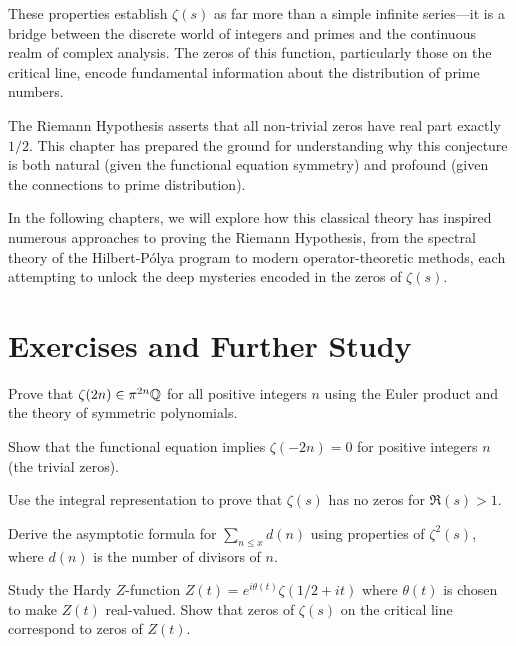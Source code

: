 These properties establish $\zeta(s)$ as far more than a simple infinite series—it is a bridge between the discrete world of integers and primes and the continuous realm of complex analysis. The zeros of this function, particularly those on the critical line, encode fundamental information about the distribution of prime numbers.

\begin{highlight}
The Riemann Hypothesis asserts that all non-trivial zeros have real part exactly $1/2$. This chapter has prepared the ground for understanding why this conjecture is both natural (given the functional equation symmetry) and profound (given the connections to prime distribution).
\end{highlight}

In the following chapters, we will explore how this classical theory has inspired numerous approaches to proving the Riemann Hypothesis, from the spectral theory of the Hilbert-Pólya program to modern operator-theoretic methods, each attempting to unlock the deep mysteries encoded in the zeros of $\zeta(s)$.

\section{Exercises and Further Study}
\label{sec:exercises}

\begin{exercise}
Prove that $\zeta(2n) \in \pi^{2n} \mathbb{Q}$ for all positive integers $n$ using the Euler product and the theory of symmetric polynomials.
\end{exercise}

\begin{exercise}
Show that the functional equation implies $\zeta(-2n) = 0$ for positive integers $n$ (the trivial zeros).
\end{exercise}

\begin{exercise}
Use the integral representation to prove that $\zeta(s)$ has no zeros for $\Re(s) > 1$.
\end{exercise}

\begin{exercise}
Derive the asymptotic formula for $\sum_{n \leq x} d(n)$ using properties of $\zeta^2(s)$, where $d(n)$ is the number of divisors of $n$.
\end{exercise}

\begin{exercise}[Advanced]
Study the Hardy $Z$-function $Z(t) = e^{i\theta(t)} \zeta(1/2 + it)$ where $\theta(t)$ is chosen to make $Z(t)$ real-valued. Show that zeros of $\zeta(s)$ on the critical line correspond to zeros of $Z(t)$.
\end{exercise}
